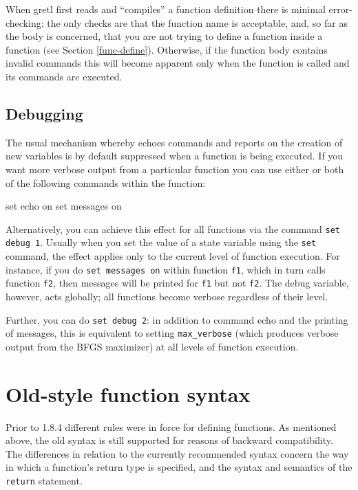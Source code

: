 When gretl first reads and ``compiles'' a function definition there is
minimal error-checking: the only checks are that the function name is
acceptable, and, so far as the body is concerned, that you are not
trying to define a function inside a function (see Section
\ref{func-define}). Otherwise, if the function body contains invalid
commands this will become apparent only when the function is called
and its commands are executed.

\subsection{Debugging}

The usual mechanism whereby  echoes commands and reports on
the creation of new variables is by default suppressed when a function
is being executed.  If you want more verbose output from a particular
function you can use either or both of the following commands within
the function:
%
\begin{code}
set echo on
set messages on
\end{code}

Alternatively, you can achieve this effect for all functions via
the command \texttt{set debug 1}.  Usually when you set the value of a
state variable using the \texttt{set} command, the effect applies only
to the current level of function execution.  For instance, if you do
\texttt{set messages on} within function \texttt{f1}, which in turn
calls function \texttt{f2}, then messages will be printed for
\texttt{f1} but not \texttt{f2}.  The debug variable, however, acts
globally; all functions become verbose regardless of their level.

Further, you can do \texttt{set debug 2}: in addition to command echo
and the printing of messages, this is equivalent to setting
\verb|max_verbose| (which produces verbose output from the BFGS
maximizer) at all levels of function execution.

\section{Old-style function syntax}
\label{sec:old-func}

Prior to  1.8.4 different rules were in force for defining
functions.  As mentioned above, the old syntax is still supported for
reasons of backward compatibility.  The differences in relation to the
currently recommended syntax concern the way in which a function's
return type is specified, and the syntax and semantics of the
\texttt{return} statement.

